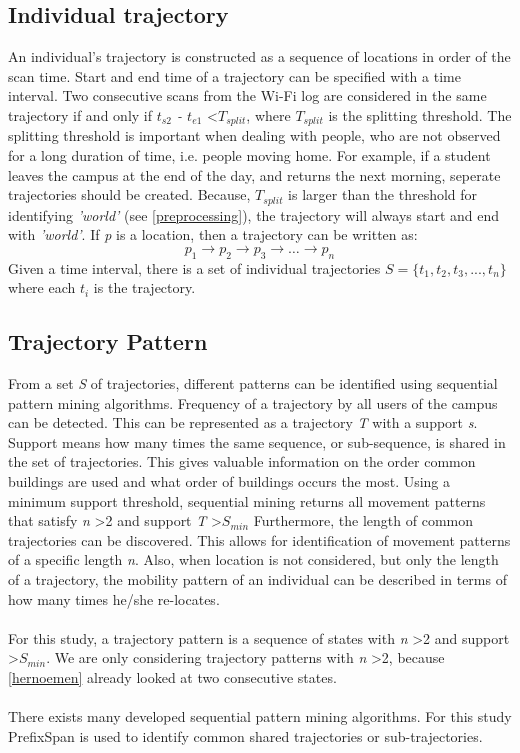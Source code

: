 \subsection{Individual trajectory}
An individual’s trajectory is constructed as a sequence of locations in order of the scan time. Start and end time of a trajectory can be specified with a time interval. Two consecutive scans from the Wi-Fi log are considered in the same trajectory if and only if \textit{$t_{s2}$ - $t_{e1}$} \textless \textit{$T_{split}$}, where \textit{$T_{split}$} is the splitting threshold. The splitting threshold is important when dealing with people, who are not observed for a long duration of time, i.e. people moving home. For example, if a student leaves the campus at the end of the day, and returns the next morning, seperate trajectories should be created. Because, \textit{$T_{split}$} is larger than the threshold for identifying \textit{'world'} (see \autoref{preprocessing}), the trajectory will always start and end with \textit{'world'}. If \textit{p} is a location, then a trajectory can be written as:
$$p_{1} \rightarrow p_{2} \rightarrow p_{3} \rightarrow …\rightarrow p_{n}$$
Given a time interval, there is a set of individual trajectories $\textit{S} = \{t_{1}, t_{2}, t_{3},...,t_{n}\}$ where each $t_{i}$ is the trajectory. 

\subsection{Trajectory Pattern}
From a set \textit{S} of trajectories, different patterns can be identified using sequential pattern mining algorithms. Frequency of a trajectory by all users of the campus can be detected. This can be represented as a trajectory \textit{T} with a support \textit{s}. Support means how many times the same sequence, or sub-sequence, is shared in the set of trajectories. This gives valuable information on the order common buildings are used and what order of buildings occurs the most. Using a minimum support threshold, sequential mining returns all movement patterns that satisfy \textit{n} \textgreater 2 and support \textit{T} \textgreater \textit{$S_{min}$}   Furthermore, the length of common trajectories can be discovered. This allows for identification of movement patterns of a specific length \textit{n}. Also, when location is not considered, but only the length of a trajectory, the mobility pattern of an individual can be described in terms of how many times he/she re-locates. \\\\
For this study, a trajectory pattern is a sequence of states with \textit{n} \textgreater 2 and support \textgreater \textit{$S_{min}$}. We are only considering trajectory patterns with \textit{n} \textgreater 2, because \autoref{hernoemen} already looked at two consecutive states.\\\\
There exists many developed sequential pattern mining algorithms. For this study PrefixSpan \cite{pei2004mining} is used to identify common shared trajectories or sub-trajectories.  
